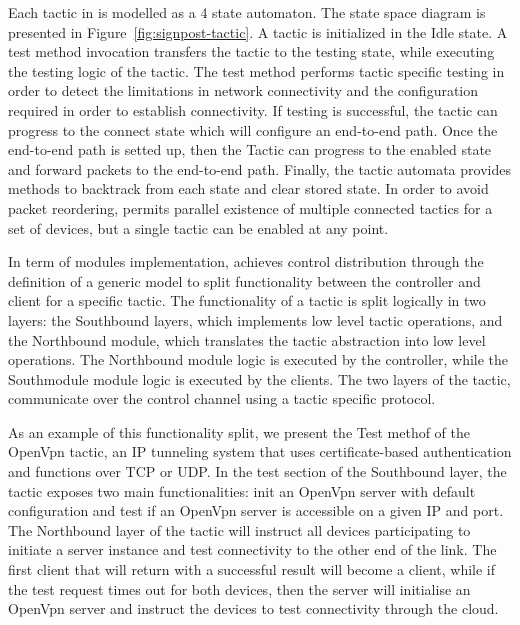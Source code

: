 Each tactic in \signpost is modelled as a 4 state automaton.  The state space
diagram is presented in Figure~\ref{fig:signpost-tactic}. A tactic is
initialized in the Idle state. A test method invocation transfers the tactic to
the testing state, while executing the testing logic of the tactic. The test
method performs tactic specific testing in order to detect the limitations in
network connectivity and the configuration required in order to establish
connectivity. If testing is successful, the tactic can progress to the connect
state which will configure an end-to-end path. Once the end-to-end path is
setted up, then the Tactic can progress to the enabled state and forward packets
to the end-to-end path.  Finally, the tactic automata provides methods to
backtrack from each state and clear stored state. In order to avoid packet
reordering, \signpost permits parallel existence of multiple connected tactics
for a set of devices, but a single tactic can be enabled at any point. 

In term of modules implementation, \signpost achieves control distribution
through the definition of a generic model to split functionality between the
\signpost controller and client for a specific tactic.  The functionality of a \signpost tactic
is split logically in two layers: the Southbound layers, which implements low
level tactic operations, and the Northbound module,
which translates the tactic abstraction into low level operations.  The
Northbound module logic is executed by the \signpost controller, while the
Southmodule module logic is executed by the \signpost clients. The two layers of
the tactic, communicate over the control channel using a tactic specific
protocol. 

As an example of this functionality split, we present the Test methof of the
OpenVpn tactic, an IP tunneling system that uses certificate-based
authentication and functions over TCP or UDP. In the test section of the
Southbound layer, the tactic exposes two main functionalities: init an OpenVpn
server with default configuration and test if an OpenVpn server is accessible on
a given IP and port. The Northbound layer of the tactic will instruct all
devices participating to initiate a server instance and test connectivity to the
other end of the link. The first client that will return with a successful
result will become a client, while if the test request times out for both
devices, then the server will initialise an OpenVpn server and instruct the
devices to test connectivity through the cloud.

